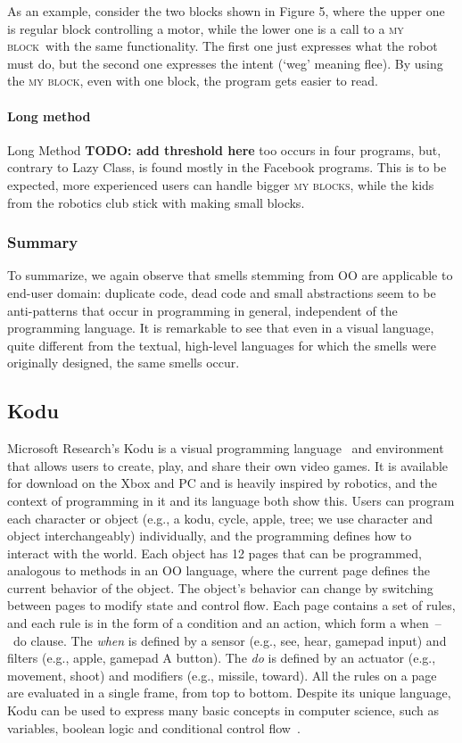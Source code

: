 \documentclass{sig-alternate}
\newcommand{\todo}[1]{\textbf{TODO: #1}}
\newcommand{\mbs}{\textsc{my blocks}}
\newcommand{\mb}{\textsc{my block}}
\begin{document}
As an example, consider the two blocks shown in Figure 5, where the upper one is regular block controlling a motor, while the lower one is a call to a \mb~with the same functionality. The first one just expresses what the robot must do, but the second one expresses the intent (`weg' meaning flee). By using the \mb, even with one block, the program gets easier to read.

\paragraph{Long method}
Long Method \todo{add threshold here} too occurs in four programs, but, contrary to Lazy Class, is found mostly in the Facebook programs. This is to be expected, more experienced users can handle bigger \mbs, while the kids from the robotics club stick with making small blocks.

\subsubsection{Summary}
To summarize, we again observe that smells stemming from OO are applicable to end-user domain: duplicate code, dead code and small abstractions seem to be anti-patterns that occur in programming in general, independent of the programming language. It is remarkable to see that even in a visual language, quite different from the textual, high-level languages for which the smells were originally designed, the same smells occur.


\subsection{Kodu}
Microsoft Research's Kodu is a visual programming language~\cite{kodugrammar} and environment that allows users to create, play, and share their own video games. 
It is available for download on the Xbox and PC and is heavily inspired by robotics, and the context of programming in it and its language both show this. 
Users can program each character or object (e.g., a kodu, cycle, apple, tree; we use character and object interchangeably) individually, and the programming defines how to interact with the world. Each object has 12 pages that can be programmed, analogous to methods in an OO language, where the current page defines the current behavior of the object. 
The object's behavior can change by switching between pages to modify state and control flow. 
Each page contains a set of rules, and each rule is in the form of a condition and an action, which form a when~--~do clause. The \emph{when} is defined by a sensor (e.g., see, hear, gamepad input) and filters (e.g., apple, gamepad A button). The \emph{do} is defined by an actuator (e.g., movement, shoot) and modifiers (e.g., missile, toward). All the rules on a page are evaluated in a single frame, from top to bottom. 
Despite its unique language, Kodu  can be used to express many basic concepts in computer science, such as variables, boolean logic and conditional control flow~\cite{Stolee:2011:ECS:1953163.1953197}. 
\end{document}
